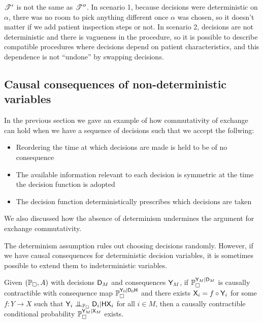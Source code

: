 $\mathscr{T}'$ is not the same as $\mathscr{T}''$. In scenario 1, because decisions were deterministic on $\alpha$, there was no room to pick anything different once $\alpha$ was chosen, so it doesn't matter if we add patient inspection steps or not. In scenario 2, decisions are not deterministic and there is vagueness in the procedure, so it is possible to describe compatible procedures where decisions depend on patient characteristics, and this dependence is not ``undone'' by swapping decisions.


\subsection{Causal consequences of non-deterministic variables}

In the previous section we gave an example of how commutativity of exchange can hold when we have a sequence of decisions such that we accept the follwing:

\begin{itemize}
    \item Reordering the time at which decisions are made is held to be of no consequence
    \item The available information relevant to each decision is symmetric at the time the decision function is adopted
    \item The decision function deterministically prescribes which decisions are taken
\end{itemize}

We also discussed how the absence of determinism undermines the argument for exchange commutativity.

The determinism assumption rules out choosing decisions randomly. However, if we have causal consequences for deterministic decision variables, it is sometimes possible to extend them to indeterministic variables. 

\begin{lemma}\label{lem:proxy_control}
Given $(\mathbb{P}_\square,A)$ with decisions $\mathsf{D}_M$ and consequences $\mathsf{Y}_M$, if $\mathbb{P}_\square^{\mathsf{Y}_M|\mathsf{D}_M}$ is causally contractible with consequence map $\mathbb{P}_\square^{\mathsf{Y}_0|\mathsf{D}_0\mathsf{H}}$ and there exists $\mathsf{X}_i=f\circ \mathsf{Y}_i$ for some $f:Y\to X$ such that $\RV{Y}_i\CI_{\prob{P}_\square} \RV{D}_i|\RV{HX}_i$ for all $i\in M$, then a causally contractible conditional probability $\mathbb{P}_\square^{\mathsf{Y}_M|\mathsf{X}_M}$ exists.
\end{lemma}

